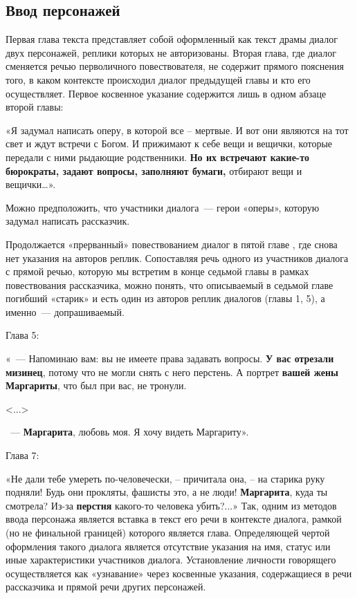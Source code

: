 \documentclass{kursa4}
\begin{document}
{{      \subsection{Ввод персонажей}

        Первая глава текста    представляет собой    оформленный как текст драмы  диалог двух персонажей, реплики которых не авторизованы.   Вторая глава,   где диалог сменяется речью перволичного повествователя, не содержит прямого пояснения того, в каком контексте происходил диалог предыдущей главы и кто его осуществляет.    Первое  косвенное  указание содержится   лишь  в одном абзаце второй главы:  

        «Я задумал написать оперу, в которой все – мертвые. И вот они
        являются на тот свет и ждут встречи с Богом. И прижимают к себе вещи и
        вещички, которые передали с ними рыдающие родственники. \textbf{Но их
        встречают какие-то бюрократы, задают вопросы, заполняют бумаги,}
        отбирают вещи и вещички…».

        Можно предположить, что участники диалога~--- герои «оперы», которую
        задумал написать рассказчик. 

        Продолжается «прерванный» повествованием диалог в пятой главе , где
        снова нет указания на авторов реплик. Сопоставляя речь одного из
        участников диалога с прямой речью, которую мы встретим в конце седьмой
        главы в рамках повествования рассказчика, можно понять, что описываемый
        в седьмой главе погибший «старик» и есть один из авторов реплик
        диалогов (главы 1, 5), а именно~--- допрашиваемый. 

        Глава 5:

        «~--- Напоминаю вам: вы не имеете права задавать вопросы. \textbf{У вас
        отрезали мизинец}, потому что не могли снять с него перстень. А портрет
        \textbf{вашей жены }\textbf{Маргариты}, что был при вас, не тронули.

        \textless{}...\textgreater{}

        ~--- \textbf{Маргарита}, любовь моя. Я хочу видеть Маргариту».

        Глава 7:

        «Не дали тебе умереть по-человечески, – причитала она, – на старика
        руку подняли! Будь они прокляты, фашисты это, а не люди!
        \textbf{Маргарита}, куда ты смотрела? Из-за \textbf{перстня} какого-то
        человека убить?...»
        Так, одним из методов ввода персонажа является вставка в текст его
        речи в контексте диалога, рамкой (но не финальной границей) которого
        является глава. Определяющей чертой оформления такого диалога является
        отсутствие указания на имя, статус или иные характеристики участников
        диалога. Установление личности говорящего осуществляется как
        «узнавание» через косвенные указания, содержащиеся в речи рассказчика
        и прямой речи других персонажей. 

}}
\end{document}
